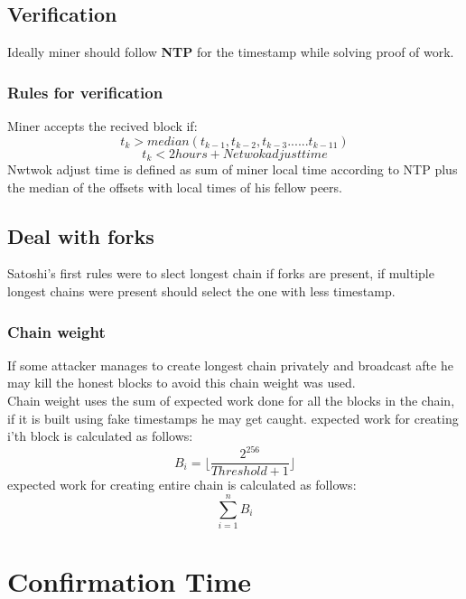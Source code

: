 \documentclass{article}
\begin{document}
\subsection{Verification}
Ideally miner should follow \textbf{NTP} for the timestamp while solving proof of work.
\subsubsection{Rules for verification}
Miner accepts the recived block if:
$$t_k > median(t_{k-1},t_{k-2},t_{k-3}...... t_{k-11})$$
$$t_k < 2hours + Netwok adjust time$$
Nwtwok adjust time is defined as sum of miner local time according to NTP plus the median of the offsets with local times of his fellow peers.
\subsection{Deal with forks}
Satoshi's first rules were to slect longest chain if forks are present, if multiple longest chains were present should select the one with less timestamp.
\subsubsection{Chain weight}
If some attacker manages to create longest chain privately and broadcast afte he may kill the honest blocks to avoid this chain weight was used. \\
Chain weight uses the sum of expected work done for all the blocks
in the chain, if it is built using fake timestamps he may get caught.
expected work for creating i'th block is calculated as follows:
$$B_i = \lfloor \frac{2^{256}}{Threshold + 1} \rfloor$$
expected work for creating entire chain is calculated as follows:
$$\sum_{i=1}^{n}B_i$$
\section{Confirmation Time}
\end{document}
